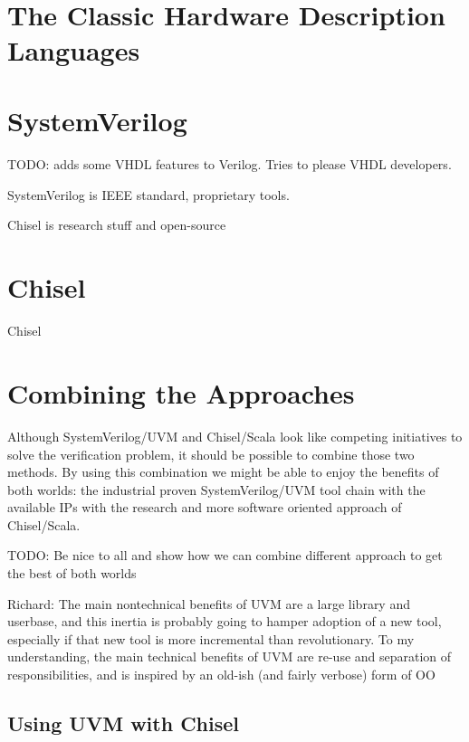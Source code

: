 \documentclass[conference]{IEEEtran}
\newcommand{\todo}[1]{{\color{olive} TODO: #1}}
\newcommand{\ducky}[1]{{\color{orange} Richard: #1}}
\begin{document}
~
\newpage
~
\newpage

\section{The Classic Hardware Description Languages}

\section{SystemVerilog}

\todo{adds some VHDL features to Verilog. Tries to please VHDL developers.}

SystemVerilog is IEEE standard, proprietary tools.

Chisel is research stuff and open-source

\section{Chisel}

Chisel~\cite{chisel:dac2012} 

\section{Combining the Approaches}

Although SystemVerilog/UVM and Chisel/Scala look like competing initiatives
to solve the verification problem, it should be possible to combine those two methods.
By using this combination we might be able to enjoy the benefits of both worlds:
the industrial proven SystemVerilog/UVM tool chain with the available IPs with
the research and more software oriented approach of Chisel/Scala. 

\todo{Be nice to all and show how we can combine different approach to
get the best of both worlds}

\ducky{The main nontechnical benefits of UVM are a large library and userbase, and this inertia is probably going to hamper adoption of a new tool, especially if that new tool is more incremental than revolutionary. To my understanding, the main technical benefits of UVM are re-use and separation of responsibilities, and is inspired by an old-ish (and fairly verbose) form of OO}

\subsection{Using UVM with Chisel}
\end{document}
